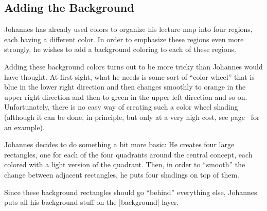 \subsection{Adding the Background}

Johannes has already used colors to organize his lecture map into four
regions, each having a different color. In order to emphasize these
regions even more strongly, he wishes to add a background coloring to
each of these regions.

Adding these background colors turns out to be more tricky than
Johannes would have thought. At first sight, what he needs is some
sort of ``color wheel'' that is blue in the lower right direction and
then changes smoothly to orange in the upper right direction and then
to green in the upper left direction and so on. Unfortunately, there
is no easy way of creating such a color wheel shading (although
it can be done, in principle, but only at a very high cost, see
page~\pageref{shading-color-wheel} for an example).

Johannes decides to do something a bit more basic: He creates four
large rectangles, one for each of the four quadrants around the
central concept, each colored with a light version of the
quadrant. Then, in order to ``smooth'' the change between adjacent
rectangles, he puts four shadings on top of them.

Since these background rectangles should go ``behind'' everything
else, Johannes puts all his background stuff on the |background|
layer.

